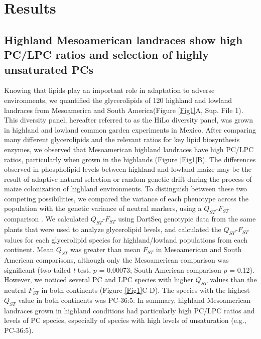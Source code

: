 \documentclass[9pt,twocolumn,twoside,lineno]{biorxiv}
\begin{document}
\section{Results}
\label{sec:results}
\subsection{Highland Mesoamerican landraces show high PC/LPC ratios and selection of highly unsaturated PCs}
Knowing that lipids play an important role in adaptation to adverse environments, we quantified the glycerolipids of 120 highland and lowland landraces from Mesoamerica and South America(Figure \ref{Fig1}A, Sup. File 1). 
This  diversity panel, hereafter referred to as the HiLo diversity panel, was grown in highland and lowland common garden experiments in Mexico.
After comparing many different glycerolipids and the relevant ratios for key lipid biosynthesis enzymes, we observed that Mesoamerican highland landraces have  high PC/LPC ratios,  particularly when grown in the highlands (Figure \ref{Fig1}B).
The differences observed in phospholipid levels between highland and lowland maize may be the result of adaptive natural selection or random genetic drift during the process of maize colonization of highland environments.
To distinguish between these two competing possibilities, we compared the variance of each phenotype across the population with the genetic variance of neutral markers, using a $Q_{ST}$-$F_{ST}$ comparison \cite{Leinonen2013-ic}.
We calculated $Q_{ST}$-$F_{ST}$ using DartSeq genotypic data from the same plants that were used to analyze glycerolipid levels, and calculated the $Q_{ST}$-$F_{ST}$ values for each glycerolipid species for highland/lowland populations from each continent. 
Mean $Q_{ST}$ was greater than mean $F_{ST}$ in Mesoamerican and South American comparisons, although only the Mesoamerican comparison was significant (two-tailed \textit{t}-test, $p$ = 0.00073; South American comparison $p$ = 0.12).
However, we noticed several PC and LPC species with higher $Q_{ST}$ values than the neutral $F_{ST}$ in both continents (Figure \ref{Fig1}C-D).
The species with the highest $Q_{ST}$ value in both continents was PC-36:5. 
In summary, highland Mesoamerican landraces grown in highland conditions had particularly high PC/LPC ratios and levels of PC species, especially of species with high levels of unsaturation (e.g., PC-36:5). 
\end{document}

